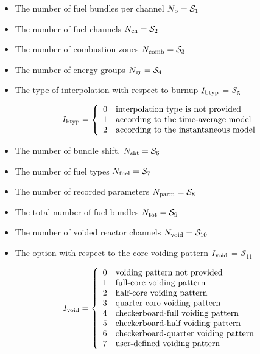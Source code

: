 \begin{itemize}

\item The number of fuel bundles per channel $N_{\rm b} = \mathcal{S}_1$

\item The number of fuel channels $N_{\rm ch} = \mathcal{S}_2$

\item The number of combustion zones $N_{\rm comb} = \mathcal{S}_3$

\item The number of energy groups $N_{\rm gr} = \mathcal{S}_4$

\item The type of interpolation with respect to burnup $I_{\rm btyp}$ = $\mathcal{S}_5$

\begin{displaymath} I_{\rm btyp} = \left\{
\begin{array}{rl}
 0 & \textrm{interpolation type is not provided} \\
 1 & \textrm{according to the time-average model} \\
 2 & \textrm{according to the instantaneous model} \\
\end{array} \right.
\end{displaymath}

\item The number of bundle shift. $N_{\rm sht} = \mathcal{S}_{6}$

\item The number of fuel types $N_{\rm fuel} = \mathcal{S}_7$

\item The number of recorded parameters $N_{\rm parm} = \mathcal{S}_8$

\item The total number of fuel bundles $N_{\rm tot} = \mathcal{S}_9$

\item The number of voided reactor channels $N_{\rm void} = \mathcal{S}_{10}$

\item The option with respect to the core-voiding pattern $I_{\rm void}$ = $\mathcal{S}_{11}$

\begin{displaymath} I_{\rm void} = \left\{
\begin{array}{rl}
 0 & \textrm{voiding pattern not provided} \\
 1 & \textrm{full-core voiding pattern} \\
 2 & \textrm{half-core voiding pattern} \\
 3 & \textrm{quarter-core voiding pattern} \\
 4 & \textrm{checkerboard-full voiding pattern} \\
 5 & \textrm{checkerboard-half voiding pattern} \\
 6 & \textrm{checkerboard-quarter voiding pattern} \\
 7 & \textrm{user-defined voiding pattern} \\
\end{array} \right.
\end{displaymath}


\end{itemize}
